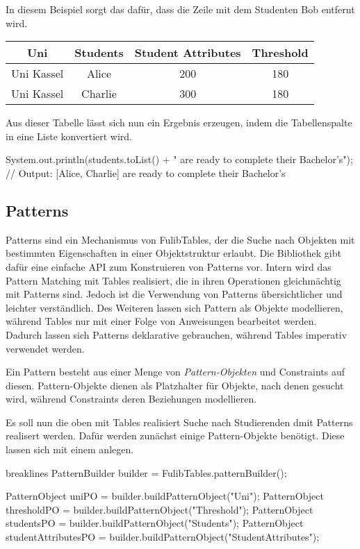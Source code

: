 In diesem Beispiel sorgt das dafür, dass die Zeile mit dem Studenten Bob entfernt wird.

\begin{tabular}{|c|c|c|c|}
    \hline
    \textbf{Uni} & \textbf{Students} & \textbf{Student Attributes} & \textbf{Threshold} \\
    \hline
    Uni Kassel & Alice   & 200 & 180 \\
    Uni Kassel & Charlie & 300 & 180 \\
    \hline
\end{tabular}

Aus dieser Tabelle lässt sich nun ein Ergebnis erzeugen, indem die Tabellenspalte  in eine Liste konvertiert wird.

\begin{jcodeblock}
    System.out.println(students.toList() + " are ready to complete their Bachelor's");
    // Output: [Alice, Charlie] are ready to complete their Bachelor's
\end{jcodeblock}

\subsection{Patterns}\label{subsec:patterns}

Patterns sind ein Mechanismus von FulibTables, der die Suche nach Objekten mit bestimmten Eigenschaften in einer Objektstruktur erlaubt.
Die Bibliothek gibt dafür eine einfache API zum Konstruieren von Patterns vor.
Intern wird das Pattern Matching mit Tables realisiert,
die in ihren Operationen gleichmächtig mit Patterns sind.
Jedoch ist die Verwendung von Patterns übersichtlicher und leichter verständlich.
Des Weiteren lassen sich Pattern als Objekte modellieren,
während Tables nur mit einer Folge von Anweisungen bearbeitet werden.
Dadurch lassen sich Patterns deklarative gebrauchen, während Tables imperativ verwendet werden.

Ein Pattern besteht aus einer Menge von \emph{Pattern-Objekten} und Constraints auf diesen.
Pattern-Objekte dienen als Platzhalter für Objekte, nach denen gesucht wird,
während Constraints deren Beziehungen modellieren.

Es soll nun die oben mit Tables realisiert Suche nach Studierenden dmit Patterns realisert werden.
Dafür werden zunächst einige Pattern-Objekte benötigt.
Diese lassen sich mit einem  anlegen.

\begin{jcodeblock*}{breaklines}
    PatternBuilder builder = FulibTables.patternBuilder();

    PatternObject uniPO = builder.buildPatternObject("Uni");
    PatternObject thresholdPO = builder.buildPatternObject("Threshold");
    PatternObject studentsPO = builder.buildPatternObject("Students");
    PatternObject studentAttributesPO = builder.buildPatternObject("StudentAttributes");
\end{jcodeblock*}

